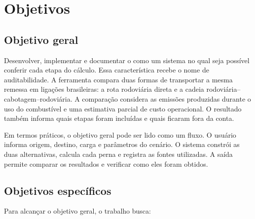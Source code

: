 \chapter{Objetivos}
\label{ch:objetivos}

\section{Objetivo geral}
\label{sec:objetivo-geral}

Desenvolver, implementar e documentar o \CabotageLens{} como um sistema no qual seja possível conferir cada etapa do cálculo. Essa característica recebe o nome de auditabilidade. A ferramenta compara duas formas de transportar a mesma remessa em ligações brasileiras: a rota rodoviária direta e a cadeia rodoviária--cabotagem--rodoviária. A comparação considera as emissões produzidas durante o uso do combustível e uma estimativa parcial de custo operacional. O resultado também informa quais etapas foram incluídas e quais ficaram fora da conta.

Em termos práticos, o objetivo geral pode ser lido como um fluxo. O usuário informa origem, destino, carga e parâmetros do cenário. O sistema constrói as duas alternativas, calcula cada perna e registra as fontes utilizadas. A saída permite comparar os resultados e verificar como eles foram obtidos.

\section{Objetivos específicos}
\label{sec:objetivos-especificos}

Para alcançar o objetivo geral, o trabalho busca:

